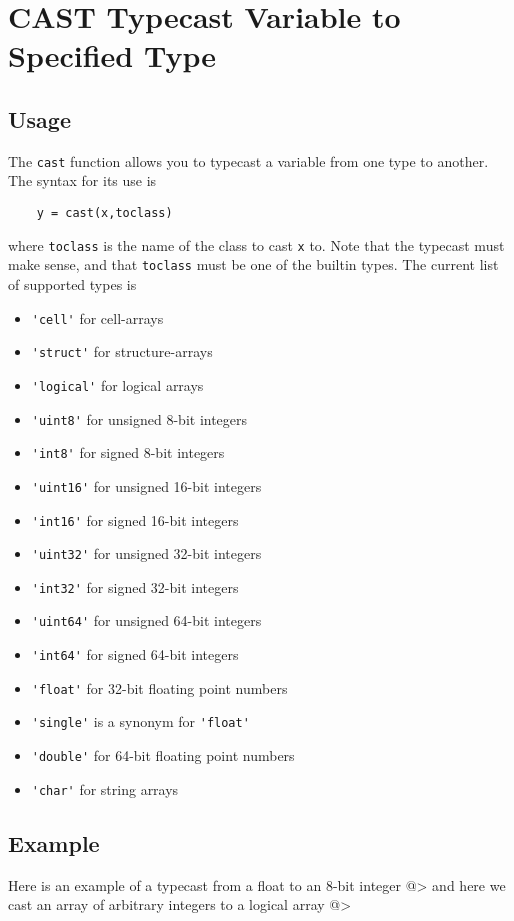 \section{CAST Typecast Variable to Specified Type}

\subsection{Usage}

The \verb|cast| function allows you to typecast a variable from one
type to another.  The syntax for its use is 
\begin{verbatim}
    y = cast(x,toclass)
\end{verbatim}
where \verb|toclass| is the name of the class to cast \verb|x| to.  Note
that the typecast must make sense, and that \verb|toclass| must be
one of the builtin types.  The current list of supported types is
\begin{itemize}
\item  \verb|'cell'| for cell-arrays

\item  \verb|'struct'| for structure-arrays

\item  \verb|'logical'| for logical arrays

\item  \verb|'uint8'| for unsigned 8-bit integers

\item  \verb|'int8'| for signed 8-bit integers

\item  \verb|'uint16'| for unsigned 16-bit integers

\item  \verb|'int16'| for signed 16-bit integers

\item  \verb|'uint32'| for unsigned 32-bit integers

\item  \verb|'int32'| for signed 32-bit integers

\item  \verb|'uint64'| for unsigned 64-bit integers

\item  \verb|'int64'| for signed 64-bit integers

\item  \verb|'float'| for 32-bit floating point numbers

\item  \verb|'single'| is a synonym for \verb|'float'|

\item  \verb|'double'| for 64-bit floating point numbers

\item  \verb|'char'| for string arrays

\end{itemize}
\subsection{Example}

Here is an example of a typecast from a float to an 8-bit integer
@>
and here we cast an array of arbitrary integers to a logical array
@>
